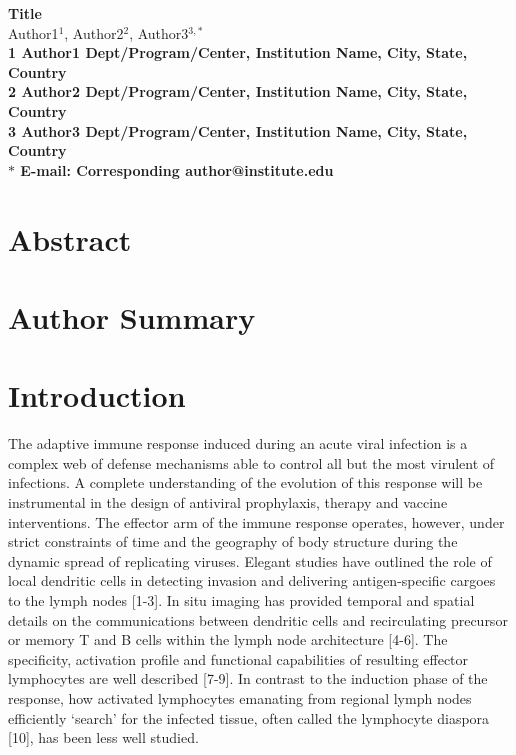 \documentclass[10pt]{article}
\date{}
\begin{document}
\begin{flushleft}
{\Large
\textbf{Title}
}
\\
Author1$^{1}$, 
Author2$^{2}$, 
Author3$^{3,\ast}$
\\
\bf{1} Author1 Dept/Program/Center, Institution Name, City, State, Country
\\
\bf{2} Author2 Dept/Program/Center, Institution Name, City, State, Country
\\
\bf{3} Author3 Dept/Program/Center, Institution Name, City, State, Country
\\
$\ast$ E-mail: Corresponding author@institute.edu
\end{flushleft}

\section*{Abstract}

\section*{Author Summary}

\section*{Introduction}

The adaptive immune response induced during an acute viral infection is a complex web of defense mechanisms able to control all but the most virulent of infections.   A complete understanding of the evolution of this response will be instrumental in the design of antiviral prophylaxis, therapy and vaccine interventions.   The effector arm of the immune response operates, however, under strict constraints of time and the geography of body structure during the dynamic spread of replicating viruses.  Elegant studies have outlined the role of local dendritic cells in detecting invasion and delivering antigen-specific cargoes to the lymph nodes [1-3].  In situ imaging has provided temporal and spatial details on the communications between dendritic cells and recirculating precursor or memory T and B cells within the lymph node architecture [4-6].  The specificity, activation profile and functional capabilities of resulting effector lymphocytes are well described [7-9].  In contrast to the induction phase of the response, how activated lymphocytes emanating from regional lymph nodes efficiently ‘search’ for the infected tissue, often called the lymphocyte diaspora [10], has been less well studied. 
\end{document}
